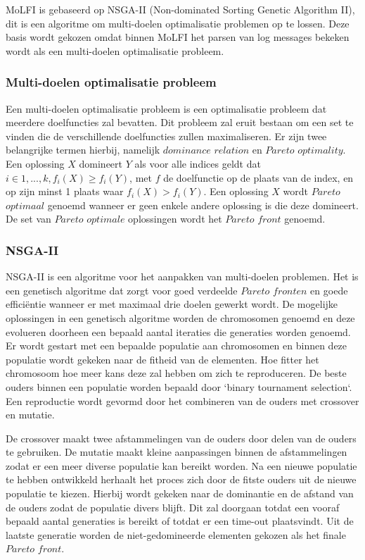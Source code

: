 MoLFI is gebaseerd op NSGA-II (Non-dominated Sorting Genetic Algorithm II), dit is een algoritme om multi-doelen optimalisatie problemen op te lossen. Deze basis wordt gekozen omdat binnen MoLFI het parsen van log messages bekeken wordt als een multi-doelen optimalisatie probleem. 

\subsubsection{Multi-doelen optimalisatie probleem}
Een multi-doelen optimalisatie probleem is een optimalisatie probleem dat meerdere doelfuncties zal bevatten. Dit probleem zal eruit bestaan om een set te vinden die de verschillende doelfuncties zullen maximaliseren. Er zijn twee belangrijke termen hierbij, namelijk $dominance$ $relation$ en $Pareto$ $optimality$. Een oplossing $X$ domineert $Y$ als voor alle indices geldt dat \(i \in {1,...,k}, f_{i}(X) \geq f_{i}(Y)\), met $f$ de doelfunctie op de plaats van de index, en op zijn minst 1 plaats waar \(f_{i}(X) > f_{i}(Y)\). Een oplossing $X$ wordt $Pareto$ $optimaal$ genoemd wanneer er geen enkele andere oplossing is die deze domineert. De set van $Pareto$ $optimale$ oplossingen wordt het $Pareto$ $front$ genoemd.

\subsubsection{NSGA-II}
NSGA-II is een algoritme voor het aanpakken van multi-doelen problemen. Het is een genetisch algoritme dat zorgt voor goed verdeelde $Pareto$ $fronten$ en goede efficiëntie wanneer er met maximaal drie doelen gewerkt wordt. De mogelijke oplossingen in een genetisch algoritme worden de chromosomen genoemd en deze evolueren doorheen een bepaald aantal iteraties die generaties worden genoemd. Er wordt gestart met een bepaalde populatie aan chromosomen en binnen deze populatie wordt gekeken naar de fitheid van de elementen. Hoe fitter het chromosoom hoe meer kans deze zal hebben om zich te reproduceren. De beste ouders binnen een populatie worden bepaald door `binary tournament selection`. Een reproductie wordt gevormd door het combineren van de ouders met crossover en mutatie. 

De crossover maakt twee afstammelingen van de ouders door delen van de ouders te gebruiken. De mutatie maakt kleine aanpassingen binnen de afstammelingen zodat er een meer diverse populatie kan bereikt worden. Na een nieuwe populatie te hebben ontwikkeld herhaalt het proces zich door de fitste ouders uit de nieuwe populatie te kiezen. Hierbij wordt gekeken naar de dominantie en de afstand van de ouders zodat de populatie divers blijft. Dit zal doorgaan totdat een vooraf bepaald aantal generaties is bereikt of totdat er een time-out plaatsvindt. Uit de laatste generatie worden de niet-gedomineerde elementen gekozen als het finale $Pareto$ $front$.

